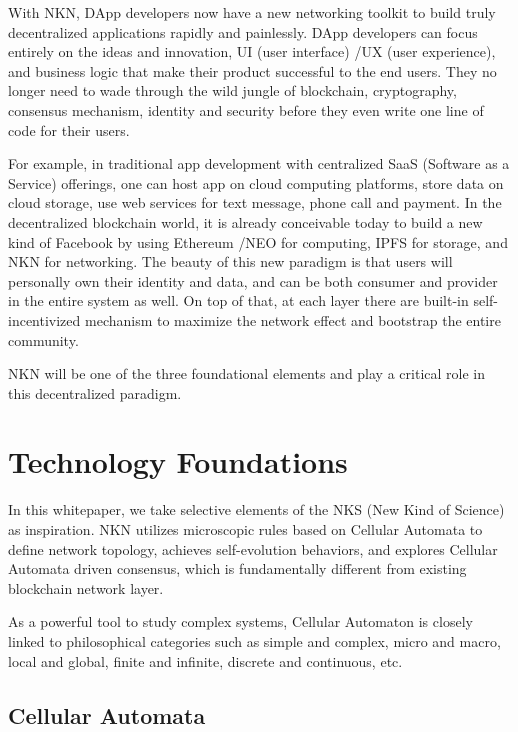 \documentclass[reprint,pre,aps]{revtex4-1}
\begin{document}
With NKN, DApp developers now have a new networking toolkit to build truly decentralized applications rapidly and painlessly. DApp developers can focus entirely on the ideas and innovation, UI (user interface) /UX (user experience), and business logic that make their product successful to the end users. They no longer need to wade through the wild jungle of blockchain, cryptography, consensus mechanism, identity and security before they even write one line of code for their users.

For example, in traditional app development with centralized SaaS (Software as a Service) offerings, one can host app on cloud computing platforms, store data on cloud storage, use web services for text message, phone call and payment. In the decentralized blockchain world, it is already conceivable today to build a new kind of Facebook by using Ethereum \cite{buterin2014next} /NEO \cite{neo} for computing, IPFS \cite{benet2014ipfs} for storage, and NKN for networking. The beauty of this new paradigm is that users will personally own their identity and data, and can be both consumer and provider in the entire system as well. On top of that, at each layer there are built-in self-incentivized mechanism to maximize the network effect and bootstrap the entire community. 

NKN will be one of the three foundational elements and play a critical role in this decentralized paradigm.

\section{Technology Foundations}

In this whitepaper, we take selective elements of the NKS (New Kind of Science) \cite{wolfram2002new} as inspiration. NKN utilizes microscopic rules based on Cellular Automata to define network topology, achieves self-evolution behaviors, and explores Cellular Automata driven consensus, which is fundamentally different from existing blockchain network layer.

As a powerful tool to study complex systems, Cellular Automaton is closely linked to philosophical categories such as simple and complex, micro and macro, local and global, finite and infinite, discrete and continuous, etc.

\subsection{Cellular Automata}
\end{document}
